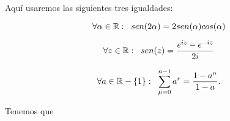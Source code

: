 Aquí usaremos las siguientes tres igualdades:

\begin{equation}
\label{eq10: 19Marzo}
\forall \alpha \in \mathbb{R}: \hspace{0.2cm}
sen(2 \alpha) = 2 sen(\alpha) cos(\alpha)
\end{equation}



\begin{equation}
\label{eq11: 19Marzo}
\forall z\in \mathbb{R}: \hspace{0.2cm}
sen(z)= \frac{e^{iz}-e^{-iz}}{2i}
\end{equation}



\begin{equation}
\label{eq12: 19Marzo}
\forall a \in \mathbb{R}-\{ 1 \}: \hspace{0.2cm}
\sum\limits_{\mu=0}^{n-1}a^{r}= \frac{1-a^{n}}{1-a}.
\end{equation}

\noindent
Tenemos que 

